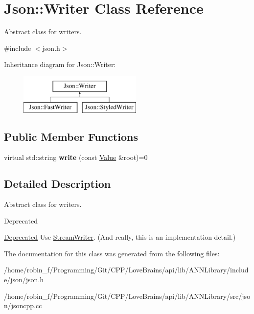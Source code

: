 \hypertarget{class_json_1_1_writer}{}\section{Json\+:\+:Writer Class Reference}
\label{class_json_1_1_writer}


Abstract class for writers.  




{\ttfamily \#include $<$json.\+h$>$}

Inheritance diagram for Json\+:\+:Writer\+:\begin{figure}[H]
\begin{center}
\leavevmode
\includegraphics[height=2.000000cm]{class_json_1_1_writer}
\end{center}
\end{figure}
\subsection*{Public Member Functions}
\begin{DoxyCompactItemize}
\item 
\hypertarget{class_json_1_1_writer_a7b2273a4ffd6f32b369ac8a53b7b5a0d}{}virtual std\+::string {\bfseries write} (const \hyperlink{class_json_1_1_value}{Value} \&root)=0\label{class_json_1_1_writer_a7b2273a4ffd6f32b369ac8a53b7b5a0d}

\end{DoxyCompactItemize}


\subsection{Detailed Description}
Abstract class for writers. 

\begin{DoxyRefDesc}{Deprecated}
\item[\hyperlink{deprecated__deprecated000007}{Deprecated}]Use \hyperlink{class_json_1_1_stream_writer}{Stream\+Writer}. (And really, this is an implementation detail.) \end{DoxyRefDesc}


The documentation for this class was generated from the following files\+:\begin{DoxyCompactItemize}
\item 
/home/robin\+\_\+f/\+Programming/\+Git/\+C\+P\+P/\+Love\+Brains/api/lib/\+A\+N\+N\+Library/include/json/json.\+h\item 
/home/robin\+\_\+f/\+Programming/\+Git/\+C\+P\+P/\+Love\+Brains/api/lib/\+A\+N\+N\+Library/src/json/jsoncpp.\+cc\end{DoxyCompactItemize}
